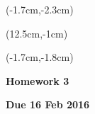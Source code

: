 \documentclass[12pt, oneside]{article}
\begin{document}


\begin{textblock*}{4cm}(-1.7cm,-2.3cm)
\end{textblock*}

\begin{textblock*}{8cm}(12.5cm,-1cm)
\end{textblock*}
\begin{textblock*}{13.5cm}(-1.7cm,-1.8cm)
\end{textblock*}

\vspace{1cm}

\begin{center}
\textbf{\Large Homework 3}

\textbf{Due 16 Feb 2016}
\end{center}
\end{document}
